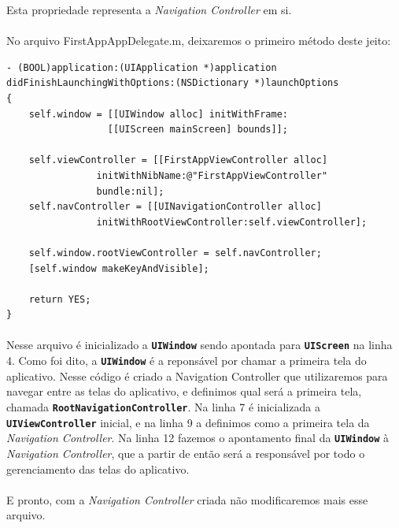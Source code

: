 \documentclass[a4paper,12pt,brazil,doubleside]{book}
\begin{document}
Esta propriedade representa a \emph{Navigation Controller} em si.

\paragraph{}No arquivo FirstAppAppDelegate.m, deixaremos o primeiro método deste jeito:

\begin{listing}
\begin{verbatim}
- (BOOL)application:(UIApplication *)application
didFinishLaunchingWithOptions:(NSDictionary *)launchOptions
{
    self.window = [[UIWindow alloc] initWithFrame:
                  [[UIScreen mainScreen] bounds]];
    
    self.viewController = [[FirstAppViewController alloc]
                initWithNibName:@"FirstAppViewController"
                bundle:nil];
    self.navController = [[UINavigationController alloc]
                initWithRootViewController:self.viewController];
   
    self.window.rootViewController = self.navController;
    [self.window makeKeyAndVisible];
    
    return YES;
}
\end{verbatim}
\end{listing}

\paragraph{}Nesse arquivo é inicializado a \texttt{\textbf{UIWindow}} sendo apontada para \texttt{\textbf{UIScreen}} na linha 4. Como foi dito, a \texttt{\textbf{UIWindow}} é a reponsável por chamar a primeira tela do aplicativo. Nesse código é criado a Navigation Controller que utilizaremos para navegar entre as telas do aplicativo, e definimos qual será a primeira tela, chamada \texttt{\textbf{RootNavigationController}}. Na linha 7 é inicializada a \texttt{\textbf{UIViewController}} inicial, e na linha 9 a definimos como a primeira tela da \emph{Navigation Controller}. Na linha 12 fazemos o apontamento final da \texttt{\textbf{UIWindow}} à \emph{Navigation Controller}, que a partir de então será a responsável por todo o gerenciamento das telas do aplicativo.
\paragraph{}E pronto, com a \emph{Navigation Controller} criada não modificaremos mais esse arquivo.\\
\end{document}
